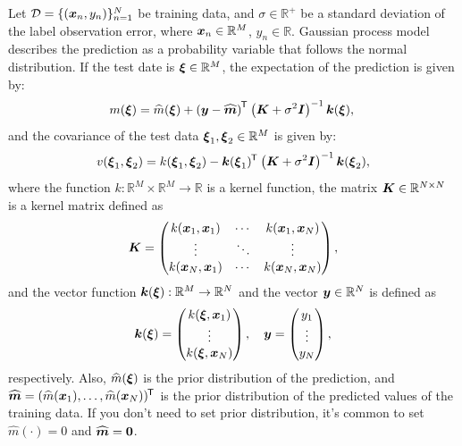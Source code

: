 \documentclass[twocolumn,a4paper,10pt]{article}
\begin{document}
Let $\mathcal{D} = \{(\boldsymbol{x}_n, y_n)\}_{n=1}^{N}$ be training data, and $\sigma \in \mathbb{R}^{+}$
be a standard deviation of the label observation error, where $\boldsymbol{x}_n \in \mathbb{R}^M$, $y_n \in \mathbb{R}$.
Gaussian process model describes the prediction as a probability variable that follows the normal distribution.
If the test date is $\boldsymbol{\xi} \in \mathbb{R}^M$, the expectation of the prediction is given by:
\begin{equation}
    m (\boldsymbol{\xi}) = \widehat{m} (\boldsymbol{\xi}) + \left( \boldsymbol{y} - \widehat{\boldsymbol{m}} \right)^{\mkern-1.5mu\mathsf{T}}\hspace{0.5pt}
    \left (\boldsymbol{K} + \sigma^2 \boldsymbol{I} \right)^{-1} \boldsymbol{k} (\boldsymbol{\xi}),
    \label{eqn:gp_exp} \\
\end{equation}
and the covariance of the test data $\boldsymbol{\xi}_1, \boldsymbol{\xi}_2 \in \mathbb{R}^M$ is given by:
\begin{equation}
    v (\boldsymbol{\xi}_1, \boldsymbol{\xi}_2) = k (\boldsymbol{\xi}_1, \boldsymbol{\xi}_2)
    - \boldsymbol{k} (\boldsymbol{\xi}_1)^{\mkern-1.5mu\mathsf{T}}\hspace{0.5pt} \left( \boldsymbol{K} + \sigma^2 \boldsymbol{I} \right)^{-1} \boldsymbol{k} (\boldsymbol{\xi}_2),
    \label{eqn:gp_cov}
\end{equation}
where the function $k: \mathbb{R}^M \times \mathbb{R}^M \to \mathbb{R}$ is a kernel function,
the matrix $\boldsymbol{K} \in \mathbb{R}^{N \times N}$ is a kernel matrix defined as
\begin {equation}
    \boldsymbol{K} = \begin{pmatrix}
        k (\boldsymbol{x}_1, \boldsymbol{x}_1) & \cdots & k (\boldsymbol{x}_1, \boldsymbol{x}_N) \\
        \vdots & \ddots & \vdots \\
        k (\boldsymbol{x}_N, \boldsymbol{x}_1) & \cdots & k (\boldsymbol{x}_N, \boldsymbol{x}_N) \\
    \end{pmatrix},
    \label{eqn:def_kernel_matrix}
\end{equation}
and the vector function $\boldsymbol{k} (\boldsymbol{\xi}): \mathbb{R}^M \to \mathbb{R}^N$ and
the vector $\boldsymbol{y} \in \mathbb{R}^N$ is defined as
\begin{equation}
    \boldsymbol{k} (\boldsymbol{\xi}) = \begin{pmatrix}
        k (\boldsymbol{\xi}, \boldsymbol{x}_1) \\
        \vdots \\
        k (\boldsymbol{\xi}, \boldsymbol{x}_N) \\
    \end{pmatrix},
    \hspace{10pt}
    \boldsymbol{y} = \begin{pmatrix}
        y_1 \\ \vdots \\ y_N \\
    \end{pmatrix},
\end{equation}
respectively.
Also, $\widehat{m} (\boldsymbol{\xi})$ is the prior distribution of the prediction, and
$\widehat{\boldsymbol{m}} = (\widehat{m} (\boldsymbol{x}_1), \ldots, \widehat{m} (\boldsymbol{x}_N))^{\mkern-1.5mu\mathsf{T}}\hspace{0.5pt}$ is
the prior distribution of the predicted values of the training data. If you don't need to set
prior distribution, it's common to set $\widehat{m} (\cdot) = 0$ and $\widehat{\boldsymbol{m}} = \boldsymbol{0}$.
\end{document}

